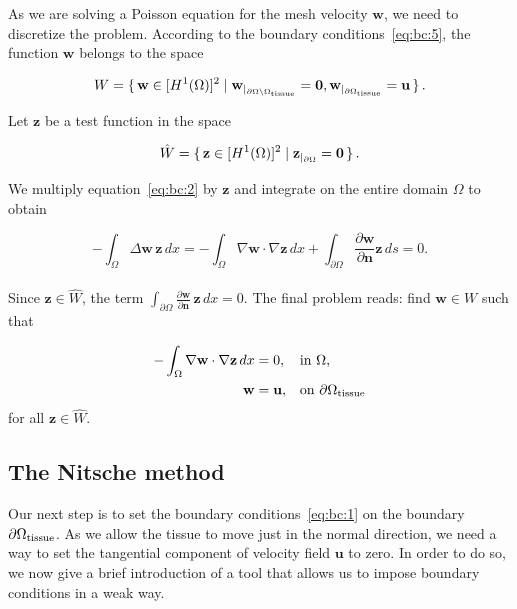 \documentclass[11pt,a4paper,titlepage]{report}
\begin{document}
As we are solving a Poisson equation for the mesh velocity $\mathbf{w}$, we need to discretize the problem. According to the boundary conditions~\eqref{eq:bc:5}, the function $\mathbf{w}$ belongs to the space

\begin{equation}
W = \set{\mathbf{w} \in [H^1(\Omega)]^2 | \mathbf{w}_{|_{\partial \Omega \setminus \Omega_{\rm tissue}}} = \mathbf{0}, \mathbf{w}_{|_{\partial \Omega_{\rm tissue} } }  = \mathbf{u} }.
\end{equation}

Let $\mathbf{z}$ be a test function in the space

\begin{equation}
\hat{W} = \set{\mathbf{z} \in [H^1(\Omega)]^2 | \mathbf{z}_{|_{\partial \Omega}} = \mathbf{0}}.
\end{equation}



We multiply equation~\eqref{eq:bc:2} by $\mathbf{z}$ and integrate on the entire domain $\Omega$ to obtain

\begin{equation}
\label{eq:bc:4}
- \int_{\Omega} \Delta \mathbf{w} \, \mathbf{z} \, dx
= - \int_{\Omega} \nabla \mathbf{w} \cdot \nabla \mathbf{z} \, dx
+ \int_{\partial \Omega} \frac{\partial \mathbf{w}}{\partial \mathbf{n}} \mathbf{z} \, ds = 0.
\end{equation}
\\
Since $\mathbf{z} \in \hat{W}$, the term $\int_{\partial \Omega} \frac{\partial \mathbf{w}}{\partial \mathbf{n}} \, \mathbf{z} \, dx  = 0$. The final problem reads: find $\mathbf{w} \in W$ such that

\begin{align}
-  \int_{\Omega} \nabla \mathbf{w} \cdot \nabla \mathbf{z} \, dx &= 0, && \text{in } \Omega, \\
 \mathbf{w} &= \mathbf{u}, && \text{on } \partial \Omega_{\rm tissue}
\end{align}
for all $ \mathbf{z} \in \hat{W}$.


\subsection{The Nitsche method}
Our next step is to set the boundary conditions~\eqref{eq:bc:1} on the boundary $\partial \Omega_{\rm tissue}$. As we allow the tissue to move just in the normal direction, we need a way to set the tangential component of velocity field $\mathbf{u}$ to zero. In order to do so, we now give a brief introduction of a tool that allows us to impose boundary conditions in a weak way.
\end{document}
